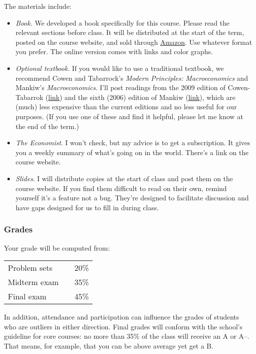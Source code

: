 \documentclass[12pt]{article}
\begin{document}
The materials include:
%
\begin{itemize}
\item {\it Book.\/}
We developed a book specifically for this course.
Please read the relevant sections before class.
It will be distributed at the start of the term,
posted on the course website,
and sold through
\href{http://www.amazon.com/Global-Economy-Stern-Department-Economics/dp/0615728006/}{Amazon}.
Use whatever format you prefer.
The online version comes with links and color graphs.

\item {\it Optional textbook.\/}
If you would like to use a traditional textbook, we recommend
Cowen and Tabarrock's {\it Modern Principles:  Macroeconomics\/}
and Mankiw's {\it Macroeconomics\/}.
I'll post readings from the 2009 edition of
Cowen-Tabarrok
(\href{http://www.amazon.com/Modern-Principles-Macroeconomics-Tyler-Cowen/dp/1429202491}{link})
and the sixth (2006) edition of Mankiw
(\href{http://www.amazon.com/Macroeconomics-N-Gregory-Mankiw/dp/0716767112/}{link}),
which are (much) less expensive than the current editions
and no less useful for our purposes.
(If you use one of these and find it helpful, please let me know at the end of the term.)


\item {\it The Economist\/}.
I won't check, but my advice is to get a subscription.
It gives you a weekly summary of what's going on in the world.
There's a link on the course website.

\item {\it Slides\/}.
I will distribute copies at the start of class and post them on the course website.
If you find them difficult to read on their own,
remind yourself it's a feature not a bug.
They're designed to facilitate discussion
and have gaps designed for us to fill in during class.
\end{itemize}


\subsubsection*{Grades}

Your grade will be computed from:
%
\begin{center}
\begin{tabular}{lcc}
    Problem sets   &&  20\% \\
    Midterm exam   &&  35\% \\
    Final exam     &&  45\%
\end{tabular}
\end{center}
%
In addition, attendance and participation can influence
the grades of students who are outliers in either direction.
Final grades will conform with the school's guideline for core courses:
no more than 35\% of the class will receive an A or A--.
That means, for example, that you can be above average yet get a B.
\end{document}
